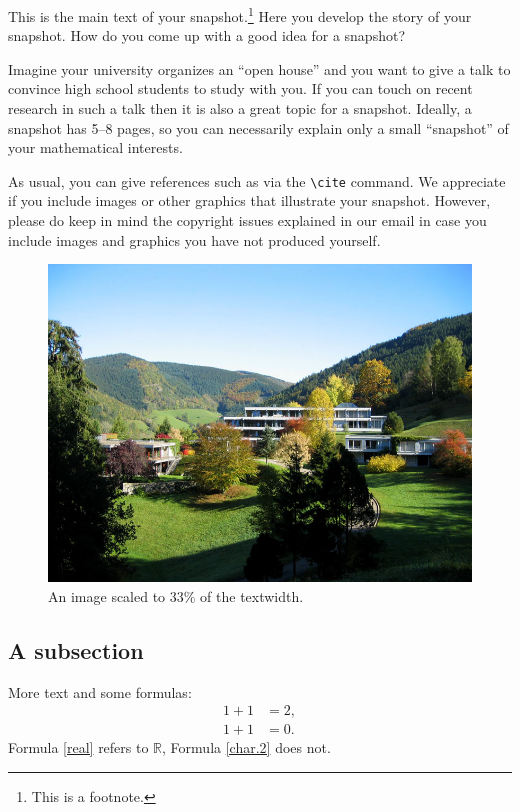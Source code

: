 \documentclass{snapshotmfo}
\begin{document}
This is the main text of your snapshot.\!\footnote{This is a footnote.} Here you develop the story of your snapshot.
How do you come up with a good idea for a snapshot?

Imagine your university organizes an ``open house'' and you want to give a talk to convince high school students to study with you. If you can touch on recent research in such a talk then it is also a great topic for a snapshot. Ideally, a snapshot has 5--8 pages, so you can necessarily explain only a small ``snapshot'' of your mathematical interests.

As usual, you can give references such as \cite{knuth1984texbook, wikiMath, sample13, sample12, sample11, sample14, helfgott14} via the \verb+\cite+ command.
We appreciate if you include images or other graphics that illustrate your snapshot. However, please do keep in mind the copyright issues explained in our email in case you include images and graphics you have not produced yourself.

\begin{figure}[ht]
        \centering
        \includegraphics[width= 0.33 \textwidth]{mfo.jpg}
        \caption{An image scaled to 33\% of the textwidth.}
\label{fig.sample-image}
\end{figure}

\subsection{A subsection}
More text and some formulas:
\begin{align}\label{real}
1+1&=2,\\\label{char.2}
1+1&=0.
\end{align}
Formula \eqref{real} refers to $\mathbb{R}$, Formula \eqref{char.2} does not.
\end{document}
